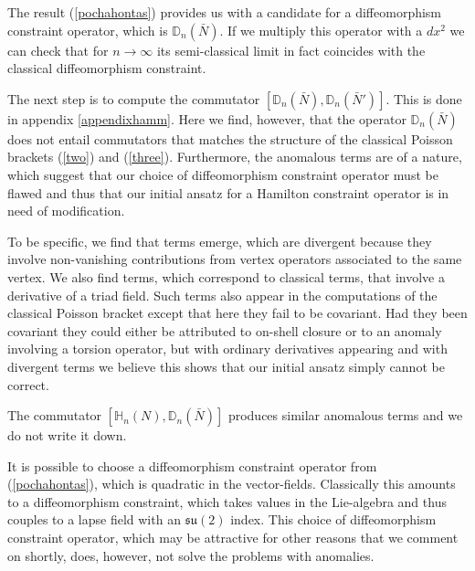 \documentclass[12pt]{article}
\begin{document}
The result (\ref{pochahontas}) provides us with a candidate for a diffeomorphism constraint operator, which is $\mathds{D}_n (\bar{N}) $. If we multiply this operator with a $dx^2$ we can check that for $n\rightarrow\infty$ its semi-classical limit in fact coincides with the classical diffeomorphism constraint. 




The next step is to compute the commutator $[\mathds{D}_n (\bar{N}) ,\mathds{D}_n (\bar{N}') ]$. This is done in appendix \ref{appendixhamm}. Here we find, however, that the operator $\mathds{D}_n (\bar{N}) $ does not entail commutators that matches the structure of the classical Poisson brackets (\ref{two}) and (\ref{three}). Furthermore, the anomalous terms are of a nature, which suggest that our choice of diffeomorphism constraint operator must be flawed and thus that our initial ansatz for a Hamilton constraint operator is in need of modification. 

To be specific, we find that terms emerge, which are divergent because they involve non-vanishing contributions from vertex operators associated to the same vertex. We also find terms, which correspond to classical terms, that involve a derivative of a triad field. Such terms also appear in the computations of the classical Poisson bracket except that here they fail to be covariant. Had they been covariant they could either be attributed to on-shell closure or to an anomaly involving a torsion operator, but with ordinary derivatives appearing and with divergent terms we believe this shows that our initial ansatz simply cannot be correct. 

The commutator $[\mathds{H}_n (N) ,\mathds{D}_n (\bar{N}) ]$ produces similar anomalous terms and we do not write it down.

It is possible to choose a diffeomorphism constraint operator from (\ref{pochahontas}), which is quadratic in the vector-fields. Classically this amounts to a diffeomorphism constraint, which takes values in the Lie-algebra and thus couples to a lapse field with an $\mathfrak{su}(2)$ index. This choice of diffeomorphism constraint operator, which may be attractive for other reasons that we comment on shortly, does, however, not solve the problems with anomalies. 
\end{document}
